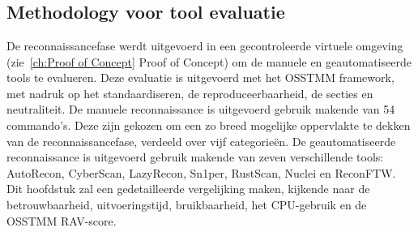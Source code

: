 
\chapter{}
\label{ch:geautomatiseerde Reconnaissance}

\section{Methodology voor tool evaluatie}

De reconnaissancefase werdt uitgevoerd in een gecontroleerde virtuele omgeving (zie~\ref{ch:Proof of Concept} Proof of Concept) om de manuele en geautomatiseerde tools te evalueren.
Deze evaluatie is uitgevoerd met het OSSTMM framework, met nadruk op het standaardiseren, de reproduceerbaarheid, de secties en neutraliteit.
De manuele reconnaissance is uitgevoerd gebruik makende van 54 commando's. 
Deze zijn gekozen om een zo breed mogelijke oppervlakte te dekken van de reconnaissancefase, verdeeld over vijf categorieën.
De geautomatiseerde reconnaissance is uitgevoerd gebruik makende van zeven verschillende tools: AutoRecon, CyberScan, LazyRecon, Sn1per, RustScan, Nuclei en ReconFTW.
Dit hoofdstuk zal een gedetailleerde vergelijking maken, kijkende naar de betrouwbaarheid, uitvoeringstijd, bruikbaarheid, het CPU-gebruik en de OSSTMM RAV-score.


